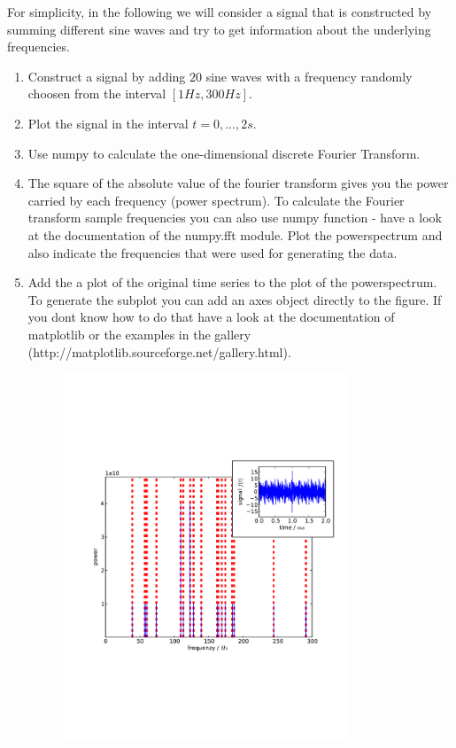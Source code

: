 \documentclass[smallheadings,12pt]{scrartcl}
\begin{document}
For simplicity, in the following we will consider a signal that is constructed by summing different sine waves and try to get information about the underlying frequencies.
\begin{enumerate}
 \item Construct a signal by adding $20$ sine waves with a frequency randomly choosen from the interval $[1Hz, 300Hz]$.
 \item Plot the signal in the interval $t=0,...,2s$.
 \item Use numpy to calculate the one-dimensional discrete Fourier Transform.
 \item The square of the absolute value of the fourier transform gives you the power carried by each frequency (power spectrum). To calculate the Fourier transform sample frequencies you can also use numpy function - have a look at the documentation of the numpy.fft module. Plot the powerspectrum and also indicate the frequencies that were used for generating the data.
 \item Add the a plot of the original time series to the plot of the powerspectrum. To generate the subplot you can add an axes object directly to the figure. If you dont know how to do that have a look at the documentation of matplotlib or the examples in the gallery (http://matplotlib.sourceforge.net/gallery.html).

\begin{figure}[H]
  \centering
  \includegraphics[width=0.8\textwidth]{pics/power}
\end{figure}
 
\end{enumerate}
\end{document}

